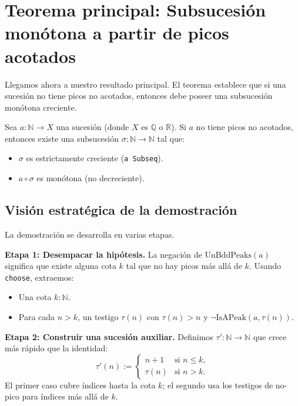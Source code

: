 \section{Teorema principal: Subsucesión monótona a partir de picos acotados}

Llegamos ahora a nuestro resultado principal. El teorema establece que si una
sucesión no tiene picos no acotados, entonces debe poseer una subsucesión
monótona creciente.

\begin{theorem}
Sea $a : \mathbb{N} \to X$ una sucesión (donde $X$ es $\mathbb{Q}$ o
$\mathbb{R}$). Si $a$ no tiene picos no acotados, entonces existe una
subsucesión $\sigma : \mathbb{N} \to \mathbb{N}$ tal que:
\begin{itemize}
  \item $\sigma$ es estrictamente creciente (\texttt{a Subseq}).
  \item $a \circ \sigma$ es monótona (no decreciente).
\end{itemize}
\end{theorem}

\subsection{Visión estratégica de la demostración}

La demostración se desarrolla en varias etapas.

\medskip
\textbf{Etapa 1: Desempacar la hipótesis.}
La negación de $\mathrm{UnBddPeaks}(a)$ significa que existe alguna cota $k$
tal que no hay picos más allá de $k$. Usando \texttt{choose}, extraemos:
\begin{itemize}
  \item Una cota $k : \mathbb{N}$.
  \item Para cada $n > k$, un testigo $\tau(n)$ con $\tau(n) > n$ y
        $\lnot\mathrm{IsAPeak}(a, \tau(n))$.
\end{itemize}

\medskip
\textbf{Etapa 2: Construir una sucesión auxiliar.}
Definimos $\tau' : \mathbb{N} \to \mathbb{N}$ que crece más rápido que la
identidad:
\[
  \tau'(n) :=
  \begin{cases}
    n + 1   & \text{si } n \leq k, \\
    \tau(n) & \text{si } n > k.
  \end{cases}
\]
El primer caso cubre índices hasta la cota $k$; el segundo usa los testigos
de no-pico para índices más allá de $k$.

